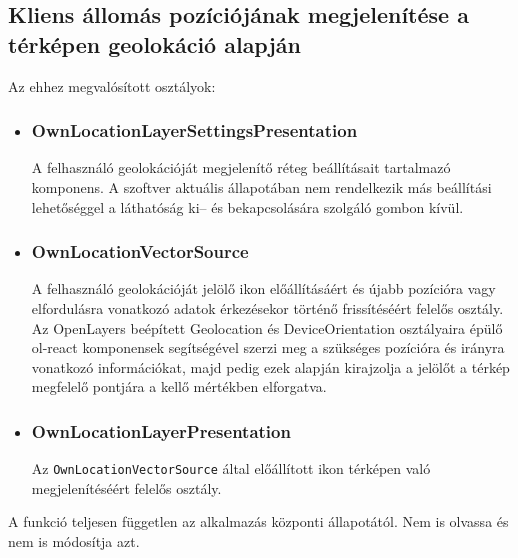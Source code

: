 \subsection{Kliens állomás pozíciójának megjelenítése a térképen geolokáció alapján}

\noindent Az ehhez megvalósított osztályok:
\begin{itemize}

\item\subsubsection{OwnLocationLayerSettingsPresentation}

A felhasználó geolokációját megjelenítő réteg beállításait tartalmazó komponens.
A szoftver aktuális állapotában nem rendelkezik más beállítási lehetőséggel a
láthatóság ki-- és bekapcsolására szolgáló gombon kívül.

\item\subsubsection{OwnLocationVectorSource}

A felhasználó geolokációját jelölő ikon előállításáért és újabb pozícióra vagy
elfordulásra vonatkozó adatok érkezésekor történő frissítéséért felelős osztály.
Az OpenLayers beépített Geolocation és DeviceOrientation osztályaira épülő
ol-react komponensek segítségével szerzi meg a szükséges pozícióra és irányra
vonatkozó információkat, majd pedig ezek alapján kirajzolja a jelölőt a térkép
megfelelő pontjára a kellő mértékben elforgatva.

\item\subsubsection{OwnLocationLayerPresentation}

Az \verb|OwnLocationVectorSource| által előállított ikon térképen való
megjelenítéséért felelős osztály.

\end{itemize}

A funkció teljesen független az alkalmazás központi állapotától. Nem is olvassa
és nem is módosítja azt.

